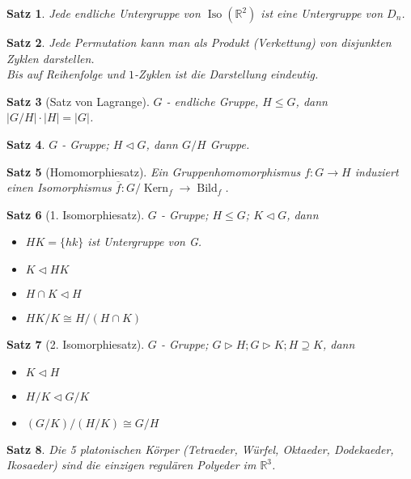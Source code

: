 \documentclass[ngerman,halfparskip]{scrartcl}
\newtheorem{satz}{Satz}
\def\R{\mathbb R}
\DeclareMathOperator{\Iso}{Iso}
\DeclareMathOperator{\Bild}{Bild}
\DeclareMathOperator{\Kern}{Kern}
\begin{document}
\begin{satz}
Jede endliche Untergruppe von $\Iso(\R^2)$ ist eine Untergruppe von $D_n$.
\end{satz}

\begin{satz}
Jede Permutation kann man als Produkt (Verkettung) von disjunkten Zyklen darstellen. \\Bis auf Reihenfolge und $1$-Zyklen ist die Darstellung eindeutig. 
\end{satz}


\begin{satz}[Satz von Lagrange]
$G$ - endliche Gruppe, $H\leq G$, dann $|G/H|\cdot |H|= |G|$.
\end{satz}


\begin{satz}
$G$ - Gruppe; $H\triangleleft G$, dann $G/H$ Gruppe.
\end{satz}


\begin{satz}[Homomorphiesatz]
 Ein Gruppenhomomorphismus $f:G\rightarrow H$ induziert einen Isomorphismus $\overline f: G/\Kern_f \rightarrow \Bild_f$.
\end{satz}


\begin{satz}[1. Isomorphiesatz]
$ G$ - Gruppe; $H\leq G$; $K \triangleleft G$, dann
\begin{itemize}
\item $HK=\{hk\}$ ist Untergruppe von G.
\item $K\triangleleft HK$
\item $H\cap K \triangleleft  H$
\item $HK/K\cong H/(H\cap K)$
\end{itemize}
\end{satz}


\begin{satz}[2. Isomorphiesatz]
$G$ - Gruppe; $G\triangleright H; G\triangleright K; H\supseteq K$, dann
\begin{itemize}
\item $K\triangleleft H$
\item $ H/K\triangleleft G/K$
\item $(G/K)/(H/K)\cong G/H$
\end{itemize}
\end{satz}


\begin{satz}
 Die 5 platonischen Körper (Tetraeder, Würfel, Oktaeder, Dodekaeder, Ikosaeder) sind die einzigen regulären Polyeder im $\R^3$.
\end{satz}
\end{document}
